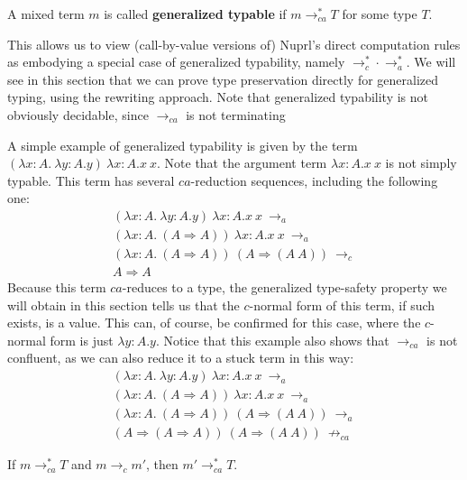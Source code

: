 \documentclass{LMCS}
\newcommand{\To}[0]{\Rightarrow}
\begin{document}
\begin{defi}
A mixed term $m$ is called \textbf{generalized typable}
if $m\to_{ca}^* T$ for some type $T$.
\end{defi}

\noindent This allows us to view (call-by-value versions of) Nuprl's
direct computation rules as embodying a special case of generalized
typability, namely $\to_c^*\cdot\to_a^*$.  We will see in this section
that we can prove type preservation directly for generalized typing,
using the rewriting approach.  Note that generalized typability is not
obviously decidable, since $\to_{ca}$ is not terminating

A simple example of generalized typability is given by the
term $(\lambda x:A.\ \lambda y:A.y)\ \lambda x:A. x\ x$.  Note that
the argument term $\lambda x:A. x\ x$ is not simply typable.  This
term has several $ca$-reduction sequences, including the following
one:
\[
\begin{array}{l}
(\lambda x:A.\ \lambda y:A.y)\ \lambda x:A.x\ x\ \to_a\\
(\lambda x:A.\ (A \To A))\ \lambda x:A.x\ x\ \to_a \\
(\lambda x:A.\ (A \To A))\ (A\To (A\ A))\ \to_c \\
A\To A
\end{array}
\]
\noindent Because this term $ca$-reduces to a type, the generalized
type-safety property we will obtain in this section tells us that the
$c$-normal form of this term, if such exists, is a value.  This can,
of course, be confirmed for this case, where the $c$-normal form is
just $\lambda y:A.y$.  Notice that this example also shows that
$\to_{ca}$ is not confluent, as we can also reduce it to a stuck term
in this way:
\[
\begin{array}{l}
(\lambda x:A.\ \lambda y:A.y)\ \lambda x:A.x\ x\ \to_a\\
(\lambda x:A.\ (A \To A))\ \lambda x:A.x\ x\ \to_a \\
(\lambda x:A.\ (A \To A))\ (A\To (A\ A))\ \to_a \\
(A\To (A \To A))\ (A\To (A\ A))\ \not\to_{ca}
\end{array}
\]

\begin{thm}
\label{thm:genpresstlc}
If $m \to_{ca}^* T$ and $m\to_c m'$, then $m'\to_{ca}^* T$.
\end{thm}
\end{document}

